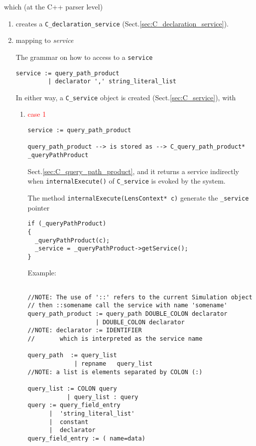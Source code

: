 which (at the C++ parser level) 
\begin{enumerate}
  \item  creates a \verb!C_declaration_service!
  (Sect.\ref{sec:C_declaration_service}).
  
  \item mapping to {\it service} 

The grammar on how to access to a \verb!service!
\begin{verbatim}
service := query_path_product 
         | declarator ',' string_literal_list

\end{verbatim}

In either way, a \verb!C_service! object is created (Sect.\ref{sec:C_service}),
with 
\begin{enumerate}
  \item  \textcolor{red}{case 1}
  
\begin{verbatim}
service := query_path_product

query_path_product --> is stored as --> C_query_path_product* _queryPathProduct
\end{verbatim}  
Sect.\ref{sec:C_query_path_product}, and it returns a service indirectly when
\verb!internalExecute()! of \verb!C_service! is evoked by the system.

The method \verb!internalExecute(LensContext* c)! generate the \verb!_service!
pointer
\begin{verbatim}
if (_queryPathProduct)
{
  _queryPathProduct(c);
  _service = _queryPathProduct->getService();
}
\end{verbatim}

Example: 
\begin{verbatim}

//NOTE: The use of '::' refers to the current Simulation object
// then ::somename call the service with name 'somename'
query_path_product := query_path DOUBLE_COLON declarator 
                   | DOUBLE_COLON declarator
//NOTE: declarator := IDENTIFIER 
//       which is interpreted as the service name

query_path  := query_list
             | repname   query_list
//NOTE: a list is elements separated by COLON (:)

query_list := COLON query
           | query_list : query
query := query_field_entry
      |  'string_literal_list'
      |  constant
      |  declarator
query_field_entry := ( name=data)
           

\end{verbatim}
\end{enumerate}
\end{enumerate}
